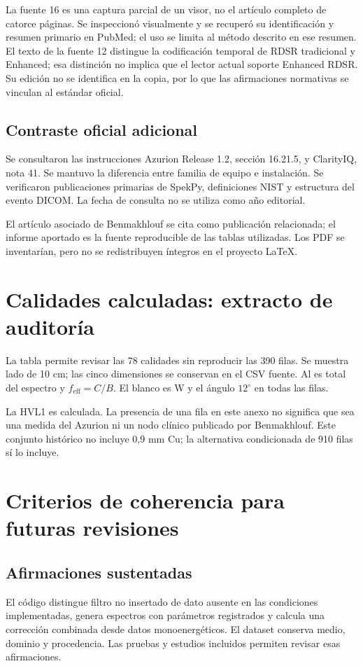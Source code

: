 La fuente 16 es una captura parcial de un visor, no el artículo completo de catorce páginas. Se inspeccionó visualmente y se recuperó su identificación y resumen primario en PubMed; el uso se limita al método descrito en ese resumen. El texto de la fuente 12 distingue la codificación temporal de RDSR tradicional y Enhanced; esa distinción no implica que el lector actual soporte Enhanced RDSR. Su edición no se identifica en la copia, por lo que las afirmaciones normativas se vinculan al estándar oficial.

\section{Contraste oficial adicional}
Se consultaron las instrucciones Azurion Release 1.2, sección 16.21.5, y ClarityIQ, nota 41. Se mantuvo la diferencia entre familia de equipo e instalación. Se verificaron publicaciones primarias de SpekPy, definiciones NIST y estructura del evento DICOM. La fecha de consulta no se utiliza como año editorial.

El artículo asociado de Benmakhlouf se cita como publicación relacionada; el informe aportado es la fuente reproducible de las tablas utilizadas. Los PDF se inventarían, pero no se redistribuyen íntegros en el proyecto LaTeX.

\chapter{Calidades calculadas: extracto de auditoría}
La tabla permite revisar las 78 calidades sin reproducir las 390 filas. Se muestra lado de 10 cm; las cinco dimensiones se conservan en el CSV fuente. Al es total del espectro y $f_{\mathrm{eff}}=C/B$. El blanco es W y el ángulo $12^\circ$ en todas las filas.

La HVL1 es calculada. La presencia de una fila en este anexo no significa que sea una medida del Azurion ni un nodo clínico publicado por Benmakhlouf. Este conjunto histórico no incluye 0,9 mm Cu; la alternativa condicionada de 910 filas sí lo incluye.
\small\normalsize

\chapter{Criterios de coherencia para futuras revisiones}
\section{Afirmaciones sustentadas}
El código distingue filtro no insertado de dato ausente en las condiciones implementadas, genera espectros con parámetros registrados y calcula una corrección combinada desde datos monoenergéticos. El dataset conserva medio, dominio y procedencia. Las pruebas y estudios incluidos permiten revisar esas afirmaciones.

